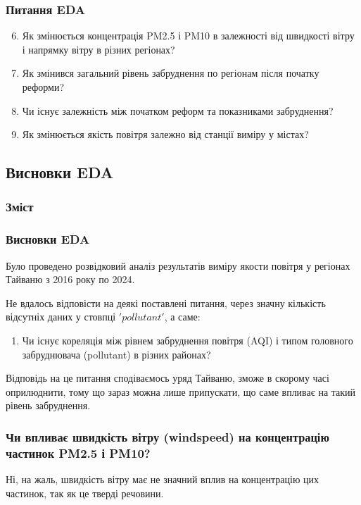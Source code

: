\documentclass{beamer}
\begin{document}
\begin{frame}
  \frametitle{Питання EDA}

  \begin{enumerate}
    \setcounter{enumi}{5}

    \item Як змінюється концентрація PM2.5 і PM10 в залежності від швидкості вітру і напрямку вітру
    в різних регіонах?
    \item Як змінився загальний рівень забруднення по регіонам після початку реформи?
    \item Чи існує залежність між початком реформ та показниками забруднення?
    \item Як змінюється якість повітря залежно від станції виміру у містах?
  \end{enumerate}
\end{frame}

\begin{frame}
  \section{Висновки EDA}

  \frametitle{Зміст}
  \tableofcontents[currentsection]
\end{frame}

\begin{frame}
  \frametitle{Висновки EDA}

Було проведено розвідковий аналіз результатів виміру якости повітря у регіонах Тайваню з 2016 року по 2024. 

Не вдалось відповісти на деякі поставлені питання, 
через значну кількість відсутніх даних у стовпці $'pollutant'$, а саме: 
\begin{enumerate}
    
    \item  Чи існує кореляція між рівнем забруднення повітря (AQI) і типом головного забруднювача (pollutant) в різних районах?
    
\end{enumerate}
Відповідь на це питання сподіваємось уряд Тайваню, зможе в скорому часі оприлюднити, 
тому що зараз можна лише припускати, що саме впливає на такий рівень забруднення.
\end{frame}


\begin{frame}
  \frametitle{Чи впливає швидкість вітру (windspeed) на концентрацію частинок PM2.5 і PM10?}

  Ні, на жаль, швидкість вітру має не значний вплив на концентрацію цих частинок, так як це тверді речовини. 

\end{frame}
\end{document}
